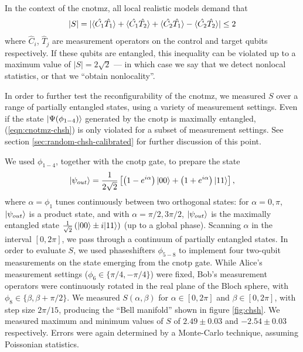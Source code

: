 In the context of the \gls{cnotmz}, all local realistic models demand that 
\begin{equation}
    |S|=|\langle \hat{C_1}\hat{T_1} \rangle
        +\langle \hat{C_1}\hat{T_2} \rangle
        +\langle \hat{C_2}\hat{T_1} \rangle
        -\langle \hat{C_2}\hat{T_2} \rangle| \le 2
        \label{eqn:cnotmz-chsh}
\end{equation}
where $\hat{C}_i$, $\hat{T}_j$ are measurement operators on the control and target qubits respectively.  If these qubits are entangled, this inequality can be violated up to a maximum value of $|S|=2\sqrt{2}$ --- in which case we say that we detect nonlocal statistics, or that we ``obtain nonlocality''. 


In order to further test the reconfigurability of the \gls{cnotmz}, we measured $S$ over a range of partially entangled states, using a variety of measurement settings.
Even if the state $\mbox{$ | \Psi (\phi_{1-4}) \rangle $}$ generated by the \gls{cnotp} is maximally entangled, (\ref{eqn:cnotmz-chsh}) is only violated for a subset of measurement settings. See section \ref{sec:random-chsh-calibrated} for further discussion of this point.

We used $\phi_{1-4}$, together with the \acrshort{cnotp} gate, to prepare the state
\begin{equation}
\mbox{$ | \psi_{out} \rangle $}=\frac{1}{2\sqrt{2}} \left [ \left ( 1-e^{i\alpha} \right ) \mbox{$ | 00 \rangle $} + \left(1+e^{i\alpha} \right)\mbox{$ | 11 \rangle $} \right ],
\end{equation}
where $\alpha=\phi_{1}$ tunes continuously between two orthogonal states: for $\alpha=0,\pi$, $\mbox{$ | \psi_{out} \rangle $}$ is a product state, and with $\alpha=\pi/2,3\pi/2$, $\mbox{$ | \psi_{out} \rangle $}$ is the maximally entangled state $\frac{1}{\sqrt{2}} \left ( \mbox{$ | 00 \rangle $} \pm i \mbox{$ | 11 \rangle $} \right )$ (up to a global phase). Scanning $\alpha$ in the interval $\left[0, 2\pi\right]$, we pass through a continuum of partially entangled states.
In order to evaluate $S$, we used phaseshifters $\phi_{5-8}$ to implement four two-qubit measurements on the state emerging from the \acrshort{cnotp} gate. 
While Alice's measurement settings ($\phi_6 \in \{ \pi / 4, -\pi/4 \}$) were fixed, 
Bob's measurement operators were continuously rotated in the real plane of the Bloch sphere, with $\phi_8 \in \{\beta, \beta+\pi/2\}$. 
We measured $S(\alpha, \beta)$ for $\alpha \in [0,2\pi]$ and $\beta \in [0, 2\pi]$, with step size $2\pi/15$, producing the ``Bell manifold'' shown in figure \ref{fig:chsh}. We measured maximum and minimum values of $S$ of $2.49\pm0.03$ and $-2.54\pm0.03$ respectively. Errors were again determined by a Monte-Carlo technique, assuming Poissonian statistics. 

